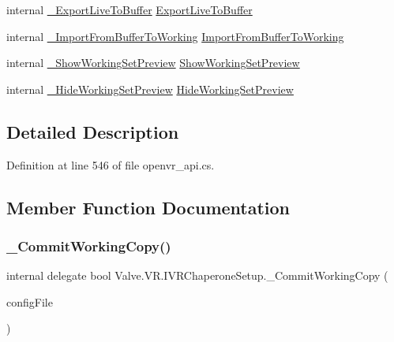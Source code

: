 \begin{DoxyCompactItemize}
\item 
internal \mbox{\hyperlink{struct_valve_1_1_v_r_1_1_i_v_r_chaperone_setup_ae409410db28f2452275177a98e0a8465}{\+\_\+\+Export\+Live\+To\+Buffer}} \mbox{\hyperlink{struct_valve_1_1_v_r_1_1_i_v_r_chaperone_setup_a67e483a22df2ace10e0382a4ce1ec8c2}{Export\+Live\+To\+Buffer}}
\item 
internal \mbox{\hyperlink{struct_valve_1_1_v_r_1_1_i_v_r_chaperone_setup_a32c372407593bf70f257cbd766b9935c}{\+\_\+\+Import\+From\+Buffer\+To\+Working}} \mbox{\hyperlink{struct_valve_1_1_v_r_1_1_i_v_r_chaperone_setup_a34e90e6fafa0847c83dd3a9ca5d3727b}{Import\+From\+Buffer\+To\+Working}}
\item 
internal \mbox{\hyperlink{struct_valve_1_1_v_r_1_1_i_v_r_chaperone_setup_a3bfcf023d5b22e50ec327fd4862751a1}{\+\_\+\+Show\+Working\+Set\+Preview}} \mbox{\hyperlink{struct_valve_1_1_v_r_1_1_i_v_r_chaperone_setup_a059557c591d436a29134e8280afab7db}{Show\+Working\+Set\+Preview}}
\item 
internal \mbox{\hyperlink{struct_valve_1_1_v_r_1_1_i_v_r_chaperone_setup_a403f94b7d21f3dbf8c27c3de8b346bce}{\+\_\+\+Hide\+Working\+Set\+Preview}} \mbox{\hyperlink{struct_valve_1_1_v_r_1_1_i_v_r_chaperone_setup_a1729d3b373a93ea2d9d610210f3a876b}{Hide\+Working\+Set\+Preview}}
\end{DoxyCompactItemize}


\subsection{Detailed Description}


Definition at line 546 of file openvr\+\_\+api.\+cs.



\subsection{Member Function Documentation}
\mbox{\label{struct_valve_1_1_v_r_1_1_i_v_r_chaperone_setup_ac4530ff8627eb38c16abc251b5f81249}} 
\subsubsection{\texorpdfstring{\_CommitWorkingCopy()}{\_CommitWorkingCopy()}}
{\footnotesize\ttfamily internal delegate bool Valve.\+V\+R.\+I\+V\+R\+Chaperone\+Setup.\+\_\+\+Commit\+Working\+Copy (\begin{DoxyParamCaption}\item[{\mbox{\hyperlink{namespace_valve_1_1_v_r_a9d16676419221d1177d39fe862e1f7d1}{E\+Chaperone\+Config\+File}}}]{config\+File }\end{DoxyParamCaption})}

